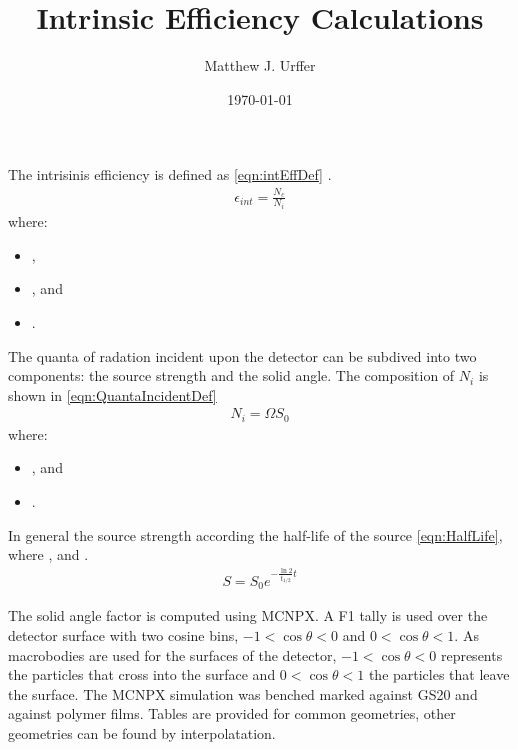 \documentclass[draftcls,onecolumn]{IEEEtran}
\begin{document}
\title{Intrinsic Efficiency Calculations}
\author{Matthew J. Urffer}
\date{\today}
\maketitle

\printnomenclature
\printindex

\listoftodos
\tableofcontents
\listoffigures
\listoftables
\lstlistoflistings

The intrisinis efficiency is defined as \eqref{eqn:intEffDef} \cite{knoll_radiation_2009}.
\begin{align}
  \epsilon_{int} = \frac{N_c}{N_i}
\end{align}
where:
\begin{itemize}
  \item[] ,
  \item[] , and
  \item[] .
\end{itemize}
The quanta of radation incident upon the detector can be subdived into two components: the source strength and the solid angle.
The composition of $N_i$ is shown in \eqref{eqn:QuantaIncidentDef}
\begin{align}
  \label{eqn:QuantaIncidentDef}
  N_i = \Omega S_0
\end{align}
where:
\begin{itemize}
  \item[] , and 
  \item[] .
\end{itemize}
In general the source strength according the half-life of the source \eqref{eqn:HalfLife}, where ,  and .
\begin{align}
  \label{eqn:HalfLife}
  S = S_0 e^{-\frac{\ln{2}}{t_{1/2}} t}
\end{align}

The solid angle factor is computed using MCNPX. 
A F1 tally is used over the detector surface with two cosine bins, $-1<\cos\theta<0$ and $0<\cos\theta<1$.
As macrobodies are used for the surfaces of the detector, $-1<\cos\theta<0$ represents the particles that cross into the surface and $0<\cos\theta<1$ the particles that leave the surface.
The MCNPX simulation was benched marked against GS20 and against polymer films.
Tables are provided for common geometries, other geometries can be found by interpolatation.
\end{document}
